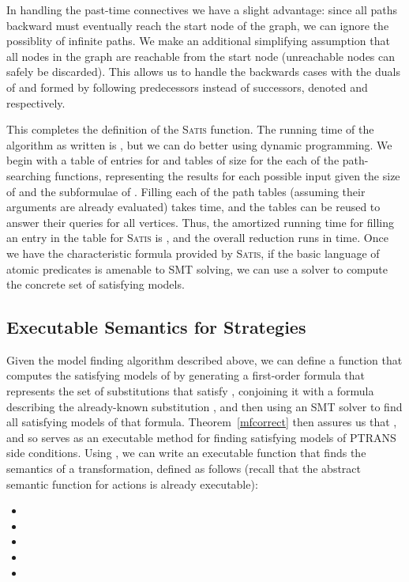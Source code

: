 \documentclass{eptcs}
\newcommand{\ptrans}[0]{PTRANS}
\begin{document}
In handling the past-time connectives we have a slight advantage: since all paths backward must eventually reach the start node of the graph, we can ignore the possiblity of infinite paths. We make an additional simplifying
assumption that all nodes in the graph are reachable from the start node (unreachable nodes can safely be discarded). This allows us to handle the
backwards cases with the duals of  and  formed by following
predecessors instead of successors, denoted  and 
respectively.

This completes the definition of the \textsc{Satis} function. The running time of the algorithm as written is
, but we can do better using dynamic programming. We
begin with a table of  entries for  and
tables of size  for the each of the path-searching functions, representing the results for each possible input given the size of  and the subformulae of . Filling each of the path tables
(assuming their arguments are already evaluated) takes  time, and the tables can
be reused to answer their queries for all vertices. Thus, the amortized running time for filling an entry in the table for \textsc{Satis} is , and the overall reduction runs in  time.
 Once we have the characteristic formula provided by \textsc{Satis}, if the basic language of atomic predicates is amenable to SMT solving, we can use a solver to compute the concrete set of satisfying models.

\subsection{Executable Semantics for Strategies}
\label{exec}

Given the model finding algorithm described above, we can define a function  that computes the satisfying models of  by generating a first-order formula that represents the set of substitutions that satisfy , conjoining it with a formula describing the already-known substitution , and then using an SMT solver to find all satisfying models of that formula. Theorem~\ref{mfcorrect} then assures us that , and so  serves as an executable method for finding satisfying models of {\ptrans} side conditions.
Using , we can write an executable function  that finds the semantics of a transformation, defined as follows (recall that the abstract semantic function for actions is already executable):
\begin{itemize}[itemindent=-2.05in, leftmargin=2.455in]
\item 
\item 
\item 
\item 
\item 
\end{itemize}
\end{document}
